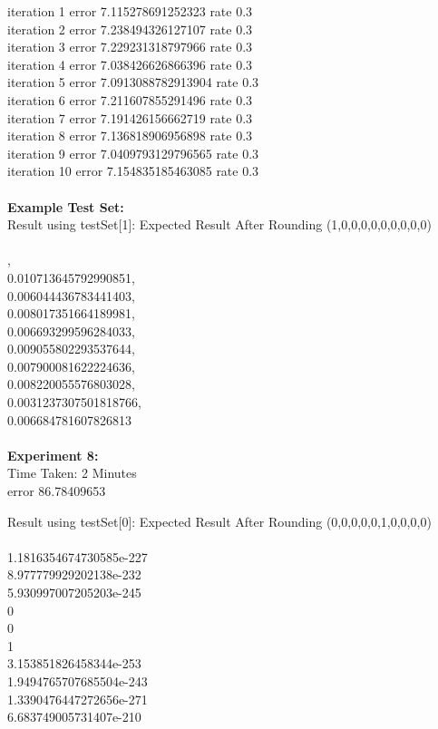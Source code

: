 \documentclass[11pt]{article}
\begin{document}
\begin{page}
\noindent iteration 1 error 7.115278691252323 rate 0.3\\
iteration 2 error 7.238494326127107 rate 0.3\\
iteration 3 error 7.229231318797966 rate 0.3\\
iteration 4 error 7.038426626866396 rate 0.3\\
iteration 5 error 7.0913088782913904 rate 0.3\\
iteration 6 error 7.211607855291496 rate 0.3\\
iteration 7 error 7.191426156662719 rate 0.3\\
iteration 8 error 7.136818906956898 rate 0.3\\
iteration 9 error 7.0409793129796565 rate 0.3\\
iteration 10 error 7.154835185463085 rate 0.3\\\\

\noindent \textbf{Example Test Set:}\\
Result using testSet[1]: Expected Result After Rounding (1,0,0,0,0,0,0,0,0,0)\\\\

,\\
  0.010713645792990851,\\
  0.006044436783441403,\\
  0.008017351664189981,\\
  0.006693299596284033,\\
  0.009055802293537644,\\
  0.007900081622224636,\\
  0.008220055576803028,\\
  0.0031237307501818766,\\
  0.006684781607826813\\
\\
\noindent \textbf{Experiment 8:} \\
Time Taken: 2 Minutes\\
error 86.78409653

Result using testSet[0]: Expected Result After Rounding (0,0,0,0,0,1,0,0,0,0)\\\\

  \noindent 1.1816354674730585e-227\\
  8.977779929202138e-232\\
  5.930997007205203e-245\\
  0\\
  0\\
  1\\
  3.153851826458344e-253\\
  1.9494765707685504e-243\\
  1.3390476447272656e-271\\
  6.683749005731407e-210\\




\end{page}
\end{document}
